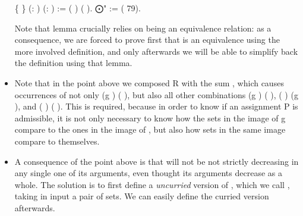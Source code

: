 \begin{itemize}
  \begin{coqdoccode}
    \coqdocnoindent
      \{  \}\coqdoceol
    \coqdocindent{1.00em}
    (:     ) (:   )   \coqdoceol
    \coqdocindent{1.00em} :=  ( ) ( ).\coqdoceol
    \coqdocnoindent
     ⨀" :=  (  79).\coqdoceol
    \coqdocemptyline
  \end{coqdoccode}

  Note that lemma  crucially relies on  being an equivalence relation: as a consequence, we are forced to prove first that  is an equivalence using the more involved definition, and only afterwards we will be able to simplify back the definition using that lemma. 

  \item Note that in the point above we composed \var R with the sum   , which causes occurrences of not only  (\var g \Placeholder) ( \Placeholder), but also all other combinations  (\var g \Placeholder) ( \Placeholder),  ( \var \Placeholder) (\var g \Placeholder), and  ( \Placeholder) ( \Placeholder). This is required, because in order to know if an assignment \var P is admissible, it is not only necessary to know how the sets in the image of \var g compare to the ones in the image of , but also how sets in the same image compare to themselves.

  \item A consequence of the point above is that  will not be not strictly decreasing in any single one of its arguments, even thought its arguments decrease as a whole. The solution is to first define a \emph{uncurried} version of , which we call , taking in input a pair of sets. We can easily define the curried version afterwards.
\end{itemize}


